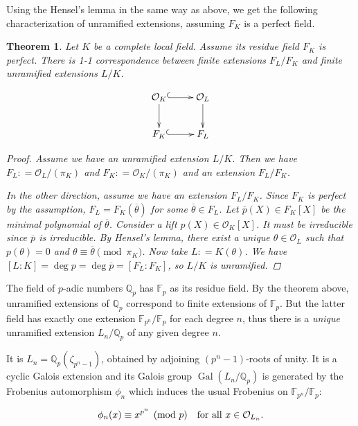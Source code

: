 \documentclass{article}
\newcommand{\dfn}{\mathrel{\mathop:}=}
\newcommand{\FF}{\mathbb{F}}
\newcommand{\QQ}{\mathbb{Q}}
\renewcommand{\O}{\mathcal{O}}
\DeclareMathOperator{\Gal}{Gal}
\newcommand{\examplesymbol}{$\blacktriangle$}
\renewcommand{\qedsymbol}{$\blacksquare$}
\theoremstyle{myplain}
\newtheorem{theorem}[proposition]{Theorem}
\theoremstyle{mydefinition}
\newenvironment{example}
  {\pushQED{\qed}\renewcommand{\qedsymbol}{\examplesymbol}\examplex}
  {\popQED\endexamplex}
\begin{document}
Using the Hensel's lemma in the same way as above, we get the following
characterization of unramified extensions, assuming $F_K$ is a perfect field.

\begin{theorem}
  Let $K$ be a complete local field. Assume its residue field $F_K$ is
  perfect. There is 1-1 correspondence between finite extensions $F_L/F_K$ and
  finite unramified extensions $L/K$.

  \[ \xymatrix{
      \O_K\ar@{^(->}[r]\ar[d] & \O_L\ar[d] \\
      F_K\ar@{^(->}[r] & F_L
    } \]

  \begin{proof}
    Assume we have an unramified extension $L / K$. Then we have
    $F_L \dfn \O_L / (\pi_K)$ and $F_K \dfn \O_K / (\pi_K)$ and an extension
    $F_L / F_K$.

    \vspace{1em}

    In the other direction, assume we have an extension $F_L/F_K$. Since $F_K$
    is perfect by the assumption, $F_L = F_K (\overline{\theta})$ for some
    $\overline{\theta} \in F_L$. Let $\overline{p} (X) \in F_K [X]$ be the
    minimal polynomial of $\overline{\theta}$. Consider a lift
    $p (X) \in \O_K [X]$. It must be irreducible since $\overline{p}$ is
    irreducible. By Hensel's lemma, there exist a \emph{unique}
    $\theta \in \O_L$ such that $p (\theta) = 0$ and
    $\theta \equiv \overline{\theta} \pmod{\pi_K}$. Now take
    $L \dfn K (\theta)$. We have
    $[L : K] = \deg p = \deg \overline{p} = [F_L : F_K]$, so $L/K$ is
    unramified.
  \end{proof}
\end{theorem}

\begin{example}\label{example:unramified-extensions-of-Qp}
  The field of $p$-adic numbers $\QQ_p$ has $\FF_p$ as its residue field. By the
  theorem above, unramified extensions of $\QQ_p$ correspond to finite
  extensions of $\FF_p$. But the latter field has exactly one extension
  $\FF_{p^n} / \FF_p$ for each degree $n$, thus there is a \emph{unique}
  unramified extension $L_n/\QQ_p$ of any given degree $n$.

  It is $L_n = \QQ_p (\zeta_{p^n-1})$, obtained by adjoining $(p^n - 1)$-roots
  of unity. It is a cyclic Galois extension and its Galois group
  $\Gal (L_n / \QQ_p)$ is generated by the Frobenius automorphism $\phi_n$ which
  induces the usual Frobenius on $\FF_{p^n} / \FF_p$:

  \[ \phi_n (x) \equiv x^{p^n} \pmod{p} \quad \text{for all }x \in \O_{L_n}. \qedhere \]
\end{example}
\end{document}
